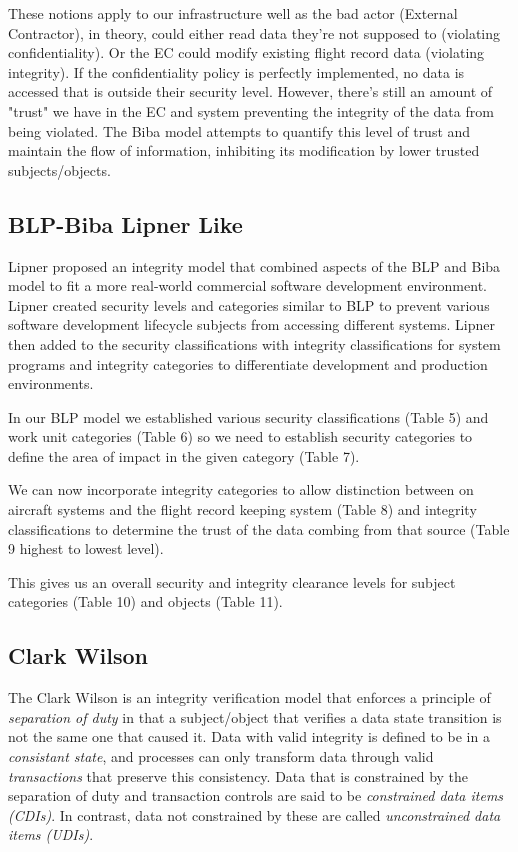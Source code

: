 \documentclass[10pt,journal,compsoc]{IEEEtran}
\begin{document}
These notions apply to our infrastructure well as the bad actor (External Contractor), in theory, could either read data they're not supposed to (violating confidentiality). Or the EC could modify existing flight record data (violating integrity). If the confidentiality policy is perfectly implemented, no data is accessed that is outside their security level. However, there's still an amount of "trust" we have in the EC and system preventing the integrity of the data from being violated. The Biba model attempts to quantify this level of trust and maintain the flow of information, inhibiting its modification by lower trusted subjects/objects. 

\subsection{BLP-Biba Lipner Like}

Lipner proposed an integrity model that combined aspects of the BLP and Biba model to fit a more real-world commercial software development environment. Lipner created security levels and categories similar to BLP to prevent various software development lifecycle subjects from accessing different systems. Lipner then added to the security classifications with integrity classifications for system programs and integrity categories to differentiate development and production environments. 

In our BLP model we established various security classifications (Table 5) and work unit categories (Table 6) so we need to establish security categories to define the area of impact in the given category (Table 7).

We can now incorporate integrity categories to allow distinction between on aircraft systems and the flight record keeping system (Table 8) and integrity classifications to determine the trust of the data combing from that source (Table 9 highest to lowest level).  

This gives us an overall security and integrity clearance levels for subject categories (Table 10) and objects (Table 11).

\subsection{Clark Wilson}

The Clark Wilson is an integrity verification model that enforces a principle of \textit{separation of duty} in that a subject/object that verifies a data state transition is not the same one that caused it. Data with valid integrity is defined to be in a \textit{consistant state}, and processes can only transform data through valid \textit{transactions} that preserve this consistency. Data that is constrained by the separation of duty and transaction controls are said to be \textit{constrained data items (CDIs)}. In contrast, data not constrained by these are called \textit{unconstrained data items (UDIs)}. 
\end{document}
